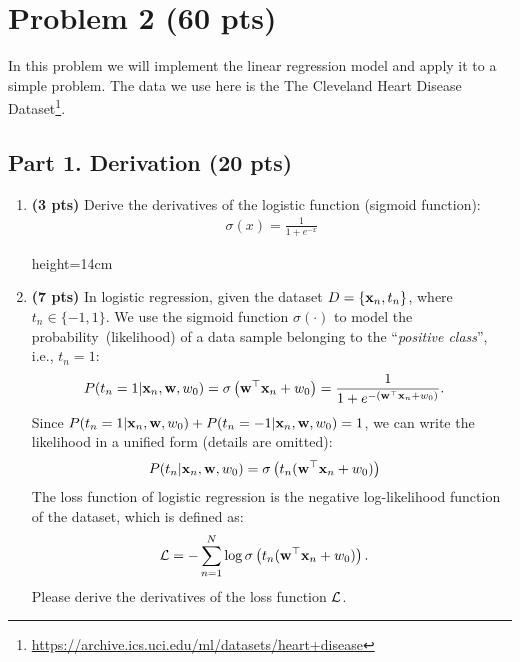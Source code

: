 \section*{Problem 2 (60 pts)}

In this problem we will implement the linear regression model and apply it to a simple problem. The data we use here is the The Cleveland Heart Disease Dataset\footnote{\url{https://archive.ics.uci.edu/ml/datasets/heart+disease}}. 

\subsection*{Part 1. Derivation (20 pts)}
\begin{enumerate}
    \item \textbf{(3 pts)} Derive the derivatives of the logistic function (sigmoid function):
    \begin{align*}
        \sigma(x) = \frac{1}{1+e^{-x}}
    \end{align*}
    \begin{soln}{height=14cm}
    \end{soln}
    
    \clearpage
    \item \textbf{(7 pts)} In logistic regression, given the dataset $D=\left\{ {\mathbf{x}}_n, t_n \right\}$, where $t_n \in \{-1,1\}$. We use the sigmoid function $\sigma(\cdot)$ to model the probability~(likelihood) of a data sample belonging to the ``\textit{positive class}'', i.e., $t_n=1$: 
    \begin{align*}
        P(t_n=1|{\mathbf{x}}_n, {\mathbf{w}}, w_0) &= \sigma \left({\mathbf{w}}^\top {\mathbf{x}}_n + w_0\right) = \frac{1}{1+e^{-\left({\mathbf{w}}^\top {\mathbf{x}}_n + w_0\right)}}.
    \end{align*}
    Since $P(t_n=1|{\mathbf{x}}_n, {\mathbf{w}}, w_0) + P(t_n=-1|{\mathbf{x}}_n, {\mathbf{w}}, w_0) =1$, we can write the likelihood in a unified form (details are omitted): 
    \begin{align*}
        P(t_n|{\mathbf{x}}_n, {\mathbf{w}}, w_0) &= \sigma \left(t_n ({\mathbf{w}}^\top {\mathbf{x}}_n + w_0)\right)
    \end{align*}
    The loss function of logistic regression is the negative log-likelihood function of the dataset, which is defined as:
    \begin{align*}
        {\mathcal{L}} &= -\sum_{n=1}^{N} \log \sigma\left( t_n ({\mathbf{w}}^\top {\mathbf{x}}_n + w_0) \right).
    \end{align*}
    Please derive the derivatives of the loss function ${\mathcal{L}}$.
    

\end{enumerate}
